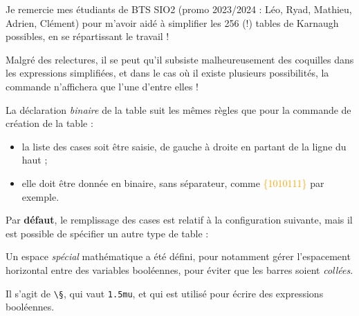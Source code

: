 \documentclass[french,a4paper,11pt]{article}
\newcommand\Cle[1]{{\small\sffamily\textlangle \textcolor{orange}{#1}\textrangle}}
\begin{document}
{{\begin{importantblock}
Je remercie mes étudiants de BTS SIO2 (promo 2023/2024 : Léo, Ryad, Mathieu, Adrien, Clément) pour m'avoir aidé à simplifier les 256 (!) tables de Karnaugh possibles, en se répartissant le travail !

\smallskip

Malgré des relectures, il se peut qu'il subsiste malheureusement des coquilles dans les expressions simplifiées, et dans le cas où il existe plusieurs possibilités, la commande n'affichera que l'une d'entre elles !
\end{importantblock}

\begin{DemoCode}
\end{DemoCode}

\begin{cautionblock}
La déclaration \textit{binaire} de la table suit les mêmes règles que pour la commande de création de la table :

\begin{itemize}
	\item la liste des cases soit être saisie, de gauche à droite en partant de la ligne du haut ;
	\item elle doit être donnée en binaire, sans séparateur, comme \Cle{\{1010111\}} par exemple.
\end{itemize}
\vspace*{-\baselineskip}\leavevmode
\end{cautionblock}

\begin{importantblock}
Par \textbf{défaut}, le remplissage des cases est relatif à la configuration suivante, mais il est possible de spécifier un autre type de table :

\begin{center}
	\begin{TableKarnaugh}
	\end{TableKarnaugh}
\end{center}
\end{importantblock}

\begin{tipblock}
Un espace \textit{spécial} mathématique a été défini, pour notamment gérer l'espacement horizontal entre des variables booléennes, pour éviter que les barres soient \textit{collées}.

Il s'agit de \texttt{\textbackslash §}, qui vaut \texttt{1.5mu}, et qui est utilisé pour écrire des expressions booléennes.
\end{tipblock}

}}
\end{document}
